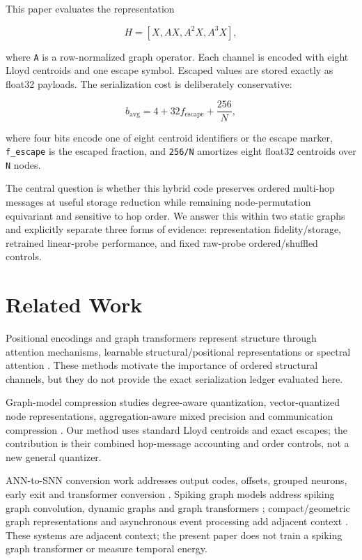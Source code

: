 \documentclass{article}
\begin{document}
This paper evaluates the representation

\[
H = [X, AX, A^2X, A^3X],
\]

where \texttt{A} is a row-normalized graph operator. Each channel is encoded with eight Lloyd centroids and one escape symbol. Escaped values are stored exactly as float32 payloads. The serialization cost is deliberately conservative:

\[
b_{\mathrm{avg}} = 4 + 32 f_{\mathrm{escape}} + \frac{256}{N},
\]

where four bits encode one of eight centroid identifiers or the escape marker, \texttt{f\_escape} is the escaped fraction, and \texttt{256/N} amortizes eight float32 centroids over \texttt{N} nodes.

The central question is whether this hybrid code preserves ordered multi-hop messages at useful storage reduction while remaining node-permutation equivariant and sensitive to hop order. We answer this within two static graphs and explicitly separate three forms of evidence: representation fidelity/storage, retrained linear-probe performance, and fixed raw-probe ordered/shuffled controls.

\section{Related Work}


Positional encodings and graph transformers represent structure through attention mechanisms, learnable structural/positional representations or spectral attention \cite{vaswani2017attention,dwivedi2021graph,kreuzer2021rethinking}. These methods motivate the importance of ordered structural channels, but they do not provide the exact serialization ledger evaluated here.

Graph-model compression studies degree-aware quantization, vector-quantized node representations, aggregation-aware mixed precision and communication compression \cite{tailor2021degreequant,ding2021vqgnn,wang2022qgtc,zhu2023a2q,wan2023adaqp,gholami2022quantization,jacob2018quantization,nagel2021white}. Our method uses standard Lloyd centroids and exact escapes; the contribution is their combined hop-message accounting and order controls, not a new general quantizer.

ANN-to-SNN conversion work addresses output codes, offsets, grouped neurons, early exit and transformer conversion \cite{one-spike,hao2023offset,lv2024group,bu2023optimal,li2023seenn,hu2023fast,zhao2025ttfs,huang2025ecmt,li2024erroraware}. Spiking graph models address spiking graph convolution, dynamic graphs and graph transformers \cite{spikinggcn,spikenet,dy-sign,delay-dsgn,signnn,sun2024spikegraphormer,zhang2025sgnnbench}; compact/geometric graph representations and asynchronous event processing add adjacent context \cite{li2023graph1bit,chaurasia2026sgspose,asgcn}. These systems are adjacent context; the present paper does not train a spiking graph transformer or measure temporal energy.
\end{document}
